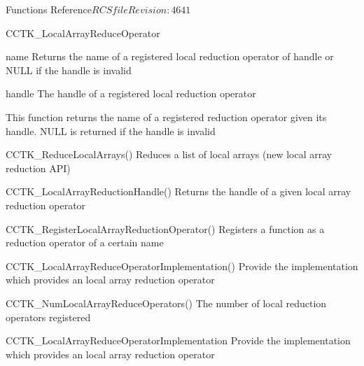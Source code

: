 \begin{cactuspart}{ Functions Reference}{$RCSfile$}{$Revision: 4641 $}
\begin{FunctionDescription}{CCTK\_LocalArrayReduceOperator}
\begin{ResultSection}
\begin{Result}{name}
Returns the name of a registered local reduction operator of handle \newline {}
or NULL if the handle is invalid
\end{Result}
\end{ResultSection}

\begin{ParameterSection}
\begin{Parameter}{handle}
The handle of a registered local reduction operator
\end{Parameter}
\end{ParameterSection}

\begin{Discussion}
This function returns the name of a registered reduction operator given
its handle. NULL is returned if the handle is invalid
\end{Discussion}

\begin{SeeAlsoSection}
\begin{SeeAlso}{CCTK\_ReduceLocalArrays()}
Reduces a list of local arrays (new local array reduction API)
\end{SeeAlso}

\begin{SeeAlso}{CCTK\_LocalArrayReductionHandle()}
Returns the handle of a given local array reduction operator
\end{SeeAlso}

\begin{SeeAlso}{CCTK\_RegisterLocalArrayReductionOperator()}
Registers a function as a reduction operator of a certain name
\end{SeeAlso}

\begin{SeeAlso}{CCTK\_LocalArrayReduceOperatorImplementation()}
Provide the implementation which provides an local array reduction operator
\end{SeeAlso}

\begin{SeeAlso}{CCTK\_NumLocalArrayReduceOperators()}
The number of local reduction operators registered
\end{SeeAlso}
\end{SeeAlsoSection}
\end{FunctionDescription}

\begin{FunctionDescription}{CCTK\_LocalArrayReduceOperatorImplementation}
\label{CCTK-LocalArrayReduceOperatorImplementation}
Provide the implementation which provides an local array reduction operator


\end{FunctionDescription}
\end{cactuspart}
